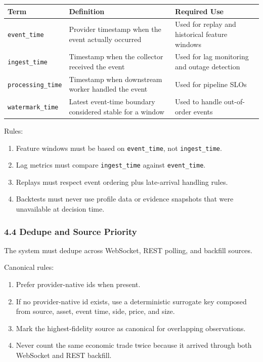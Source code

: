 \documentclass[
]{article}
\newcounter{none} %
\providecommand{\tightlist}{%
  \setlength{\itemsep}{0pt}\setlength{\parskip}{0pt}}
\begin{document}
{\def\LTcaptype{none} %
\begin{longtable}[]{@{}lll@{}}
\toprule\noalign{}
Term & Definition & Required Use \\
\midrule\noalign{}
\endhead
\bottomrule\noalign{}
\endlastfoot
\texttt{event\_time} & Provider timestamp when the event actually
occurred & Used for replay and historical feature windows \\
\texttt{ingest\_time} & Timestamp when the collector received the event
& Used for lag monitoring and outage detection \\
\texttt{processing\_time} & Timestamp when downstream worker handled the
event & Used for pipeline SLOs \\
\texttt{watermark\_time} & Latest event-time boundary considered stable
for a window & Used to handle out-of-order events \\
\end{longtable}
}

Rules:

\begin{enumerate}
\def\labelenumi{\arabic{enumi}.}
\tightlist
\item
  Feature windows must be based on \texttt{event\_time}, not
  \texttt{ingest\_time}.
\item
  Lag metrics must compare \texttt{ingest\_time} against
  \texttt{event\_time}.
\item
  Replays must respect event ordering plus late-arrival handling rules.
\item
  Backtests must never use profile data or evidence snapshots that were
  unavailable at decision time.
\end{enumerate}

\subsubsection{4.4 Dedupe and Source
Priority}\label{44-dedupe-and-source-priority}

The system must dedupe across WebSocket, REST polling, and backfill
sources.

Canonical rules:

\begin{enumerate}
\def\labelenumi{\arabic{enumi}.}
\tightlist
\item
  Prefer provider-native ids when present.
\item
  If no provider-native id exists, use a deterministic surrogate key
  composed from source, asset, event time, side, price, and size.
\item
  Mark the highest-fidelity source as canonical for overlapping
  observations.
\item
  Never count the same economic trade twice because it arrived through
  both WebSocket and REST backfill.
\end{enumerate}
\end{document}
